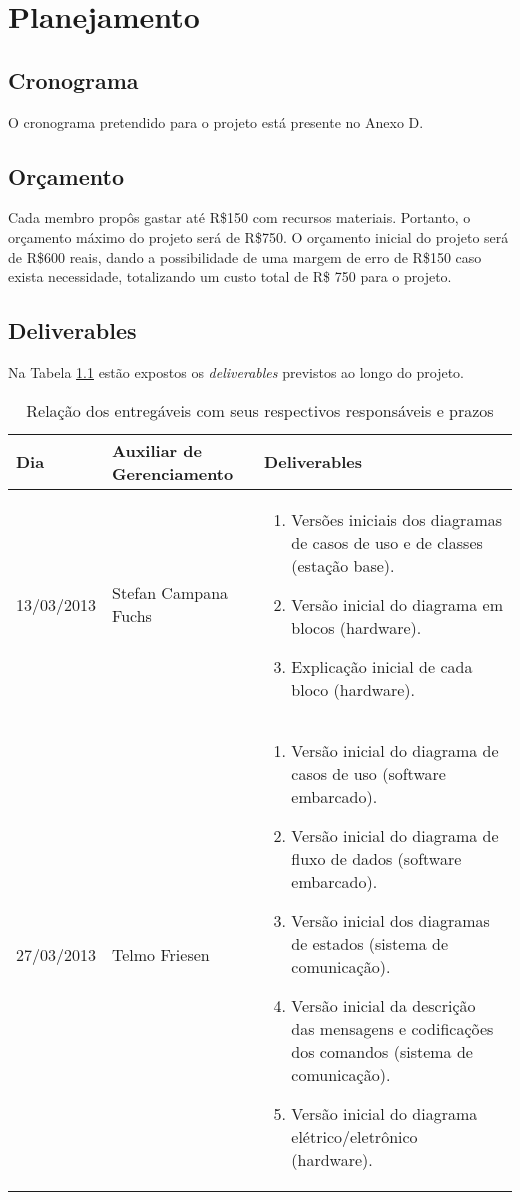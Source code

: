 \chapter{Planejamento}

\section{Cronograma}
O cronograma pretendido para o projeto está presente no Anexo D.

\section{Orçamento}
Cada membro propôs gastar até R\$150 com recursos materiais. Portanto, o orçamento máximo do projeto será de R\$750. O orçamento inicial do projeto será de R\$600 reais, dando a possibilidade de uma margem de erro de R\$150 caso exista necessidade, totalizando um custo total de R\$ 750 para o projeto.

\section{Deliverables}

Na Tabela \ref{tab:deliverables1} estão expostos os \textit{deliverables} previstos ao longo do projeto.

\begin{table}[h]
  \centering
  \caption{Relação dos entregáveis com seus respectivos responsáveis e prazos}
  \begin{tabular}{|p{3cm}|p{4cm}|p{7cm}|}
    \toprule
    \textbf{Dia}   & \textbf{Auxiliar de Gerenciamento} & \textbf{Deliverables} \\
    \hline
    13/03/2013 & Stefan Campana Fuchs & 
    \begin{enumerate}[topsep=0pt, partopsep=0pt, itemsep=0pt]
      \item Versões iniciais dos diagramas de casos de uso e de classes (estação base).
      \item Versão inicial do diagrama em blocos (hardware).
      \item Explicação inicial de cada bloco (hardware).
    \end{enumerate}\\
    \hline
    27/03/2013 & Telmo Friesen & 
    \begin{enumerate}[topsep=0pt, partopsep=0pt, itemsep=0pt]
      \item Versão inicial do diagrama de casos de uso (software embarcado).
      \item Versão inicial do diagrama de fluxo de dados (software embarcado).
      \item Versão inicial dos diagramas de estados (sistema de comunicação).
      \item Versão inicial da descrição das mensagens e codificações dos comandos (sistema de comunicação).
      \item Versão inicial do diagrama elétrico/eletrônico (hardware).
    \end{enumerate}\\
  \end{tabular}%
  \label{tab:deliverables1}%
\end{table}%



